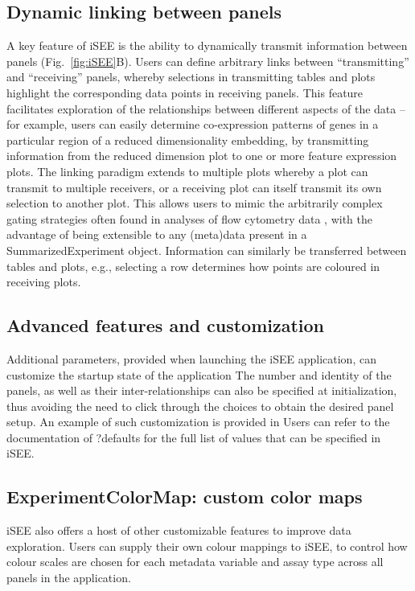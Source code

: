 \documentclass[10pt,a4paper,twocolumn]{article}
\begin{document}
\subsection*{Dynamic linking between panels}
A key feature of iSEE is the ability to dynamically transmit information between panels (Fig.~\ref{fig:iSEE}B).
Users can define arbitrary links between ``transmitting'' and ``receiving'' panels, whereby selections in transmitting tables and plots highlight the corresponding data points in receiving panels.
This feature facilitates exploration of the relationships between different aspects of the data -- for example, users can easily determine co-expression patterns of genes in a particular region of a reduced dimensionality embedding, by transmitting information from the reduced dimension plot to one or more feature expression plots.
The linking paradigm extends to multiple plots whereby a plot can transmit to multiple receivers, or a receiving plot can itself transmit its own selection to another plot.
This allows users to mimic the arbitrarily complex gating strategies often found in analyses of flow cytometry data \citep{finak2014opencyto}, with the advantage of being extensible to any (meta)data present in a SummarizedExperiment object.
Information can similarly be transferred between tables and plots, e.g., selecting a row determines how points are coloured in receiving plots.

\subsection*{Advanced features and customization}

Additional parameters, provided when launching the iSEE application, can customize the startup state of the application
The number and identity of the panels, as well as their inter-relationships can also be specified at initialization, thus avoiding the need to click through the choices to obtain the desired panel setup.
An example of such customization is provided in %
Users can refer to the documentation of ?defaults for the full list of values that can be specified in iSEE.


\subsection*{ExperimentColorMap: custom color maps}

iSEE also offers a host of other customizable features to improve data exploration.
Users can supply their own colour mappings to iSEE, to control how colour scales are chosen for each metadata variable and assay type across all panels in the application.
\end{document}
